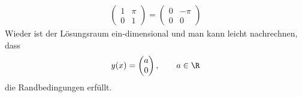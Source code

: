 \begin{solution}
\begin{enumerate}[label = \textbf{\alph*)}]
\begin{itemize}
\begin{align*}
\begin{pmatrix}
          1 & \pi  \\ 0 & 1
        \end{pmatrix}
        = \begin{pmatrix}
          0 & -\pi \\ 0 & 0
        \end{pmatrix}
      \end{align*}
      Wieder ist der Lösungsraum ein-dimensional und man kann leicht nachrechnen, dass
      \begin{align*}
        y(x) = \begin{pmatrix}
          a \\ 0
        \end{pmatrix}, \qquad a \in \R
      \end{align*}
      die Randbedingungen erfüllt.
  \end{itemize}
\end{enumerate}
\end{solution}
